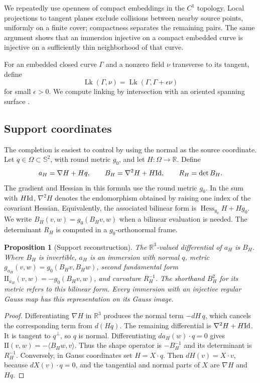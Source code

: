 \documentclass[11pt]{amsart}
\newtheorem{proposition}[theorem]{Proposition}
\theoremstyle{definition}
\theoremstyle{remark}
\newcommand{\R}{\mathbb R}\newcommand{\Sph}{\mathbb S}
\DeclareMathOperator{\Lk}{Lk}
\newcommand{\II}{\mathrm{II}}\newcommand{\Gmap}{\mathcal G}
\numberwithin{equation}{section}
\begin{document}
We repeatedly use openness of compact embeddings in the $C^1$ topology.
Local projections to tangent planes exclude collisions between nearby
source points, uniformly on a finite cover; compactness separates the
remaining pairs. The same argument shows that an immersion injective on
a compact embedded curve is injective on a sufficiently thin neighborhood
of that curve.

For an embedded closed curve $\Gamma$ and a nonzero field $\nu$ transverse
to its tangent, define
\[
 \Lk(\Gamma,\nu)=\Lk(\Gamma,\Gamma+\epsilon\nu)
\]
for small $\epsilon>0$. We compute linking by intersection with an
oriented spanning surface \cite{Rolfsen}.

\subsection{Support coordinates}\label{sec:support}
The completion is easiest to control by using the normal as the source
coordinate. Let $q\in\Omega\subset\Sph^2$, with round metric $g_0$, and
let $H:\Omega\to\R$. Define
\begin{equation}\label{eq:support}
 a_H=\nabla H+Hq,\qquad B_H=\nabla^2H+H\mathrm{Id},
 \qquad R_H=\det B_H.
\end{equation}
The gradient and Hessian in this formula use the round metric $g_0$.
In the sum with $H\mathrm{Id}$, $\nabla^2H$ denotes the endomorphism obtained
by raising one index of the covariant Hessian. Equivalently, the
associated bilinear form is $\operatorname{Hess}_{g_0}H+Hg_0$.
We write $B_H(v,w)=g_0(B_Hv,w)$ when a bilinear evaluation is needed.
The determinant $R_H$ is computed in a $g_0$-orthonormal frame.

\begin{proposition}[Support reconstruction]\label{prop:support}
The $\R^3$-valued differential of $a_H$ is $B_H$. Where $B_H$ is
invertible, $a_H$ is an immersion with normal $q$, metric
$g_{a_H}(v,w)=g_0(B_Hv,B_Hw)$, second fundamental form
$\II_{a_H}(v,w)=-g_0(B_Hv,w)$, and curvature $R_H^{-1}$.
The shorthand $B_H^2$ for its metric refers to this bilinear form. Every immersion
with an injective regular Gauss map has this representation on its Gauss
image.
\end{proposition}
\begin{proof}
Differentiating $\nabla H$ in $\R^3$ produces the normal term
$-dH\,q$, which cancels the corresponding term from $d(Hq)$.
The remaining differential is $\nabla^2H+H\mathrm{Id}$. It is tangent to
$q^\perp$, so $q$ is normal. Differentiating $da_H(w)\cdot q=0$ gives
$\II(v,w)=-\langle B_Hw,v\rangle$. Thus the shape operator is
$-B_H^{-1}$ and its determinant is $R_H^{-1}$.
Conversely, in Gauss coordinates set $H=X\cdot q$. Then
$dH(v)=X\cdot v$, because $dX(v)\cdot q=0$, and the tangential and normal
parts of $X$ are $\nabla H$ and $Hq$.
\end{proof}
\end{document}
